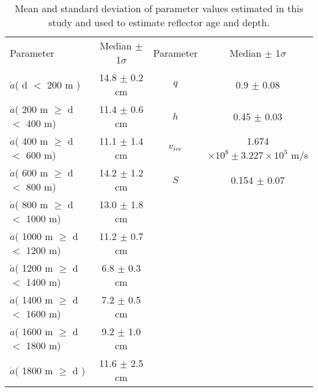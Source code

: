 \documentclass[draft,jgrga]{statclim}
\begin{document}
 \begin{table}
 \centering
 \caption{ Mean and standard deviation of parameter values estimated in this study and used to estimate reflector age and depth. }
 \begin{tabular}{ l c | c c }
Parameter & Median $\pm$ 1$\sigma$ & Parameter & Median $\pm$ 1$\sigma$  \\   
 \cline{1-4}
  $\dot{a}$( d $<$ 200 m )                         & 14.8 $\pm$ 0.2 cm & $q$            &  0.9      $\pm$ 0.08  \\
  $\dot{a}$( 200 m  $\ge$ d $<$ 400 m)    & 11.4 $\pm$ 0.6 cm & $h$            &  0.45     $\pm$ 0.03  \\
  $\dot{a}$( 400 m  $\ge$ d $<$ 600 m)    & 11.1 $\pm$ 1.4 cm & $v_{ice}$   & 1.674  $\times 10^8 \pm 3.227 \times 10^5$ m/s     \\
  $\dot{a}$( 600 m  $\ge$ d $<$ 800 m)    & 14.2 $\pm$ 1.2 cm & $S$            & 0.154    $\pm$ 0.07  \\
  $\dot{a}$( 800 m  $\ge$ d $<$ 1000 m)  & 13.0 $\pm$ 1.8 cm & \\ 
  $\dot{a}$( 1000 m $\ge$ d $<$ 1200 m) & 11.2 $\pm$ 0.7 cm & \\
  $\dot{a}$( 1200 m $\ge$ d $<$ 1400 m) &   6.8 $\pm$ 0.3 cm & \\
  $\dot{a}$( 1400 m $\ge$ d $<$ 1600 m) &   7.2 $\pm$ 0.5 cm & \\
  $\dot{a}$( 1600 m $\ge$ d $<$ 1800 m) &   9.2 $\pm$ 1.0 cm & \\
  $\dot{a}$( 1800 m $\ge$ d )                    & 11.6 $\pm$ 2.5 cm & \\%
 \end{tabular}

 \label{tab:paramvals}
\end{table}

\end{document}
